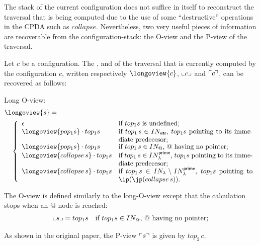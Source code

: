 \documentclass[a4paper,draft]{article}
\theoremstyle{remark}
\theoremstyle{definition}
\newcommand\INodes{IN}%
\begin{document}
The stack of the current configuration does not suffice in itself to reconstruct the traversal that is being computed
due to the use of some ``destructive'' operations in the CPDA such as $collapse$. Nevertheless, two very useful pieces of information are recoverable from the configuration-stack: the O-view and the P-view of the traversal.

Let $c$ be a configuration. The ,
 and  of the traversal that is currently computed by the configuration $c$, written respectively $\longoview{c}$, $\llcorner c \lrcorner$ and $\ulcorner c \urcorner$, can be recovered as follows:
\begin{compactitem}
\item Long O-view:
\begin{align*}
&  \longoview{s} = \\
 & \quad \left\{
  \begin{array}{ll}
      \epsilon & \mbox{if $top_1 s$ is undefined;} \\
      \longoview{pop_1 s} \cdot top_1 s & \parbox[t]{7cm}{if $top_1\,s \in \INodes_{\sf var}$, $top_1 s$ pointing to its immediate predecesor;} \\
      \longoview{pop_1 s} \cdot top_1 s & \mbox{if $top_1\,s \in \INodes_@$, $@$ having no pointer;} \\
      \longoview{collapse\,s} \cdot top_1 s & \parbox[t]{7cm}{if $top_1\,s \in \INodes_\lambda^{\sf prime}$, $top_1 s$ pointing to its immediate predecesor;} \\
      \longoview{collapse\,s} \cdot top_1 s & \parbox[t]{7cm}{if $top_1\,s \in \INodes_\lambda\setminus \INodes_\lambda^{\sf prime}$, $top_1 s$ pointing to $\ip(\jp(collapse\,s))$.}
    \end{array}
      \right.
\end{align*}
\item The O-view is defined similarly to the long-O-view except that the calculation stops when an @-node is reached:
\begin{align*}
  \oview{s}  &=   top_1 s & \mbox{if $top_1 s \in \INodes_@$, $@$ having no pointer;}
\end{align*}
\item As shown in the original paper, the P-view $\ulcorner s \urcorner$ is given by $top_2\,c$.
\end{compactitem}
\bigskip
\end{document}
